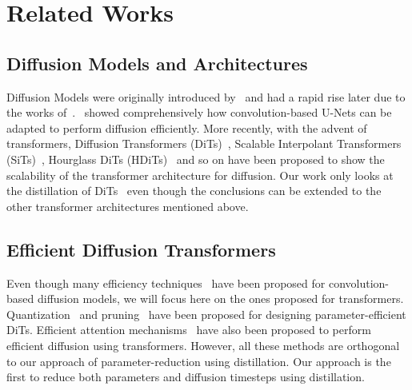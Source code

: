 \section{Related Works}
\vspace{-5pt}
\label{app: related works}
\subsection{Diffusion Models and Architectures}
Diffusion Models were originally introduced by~\citep{sohl2015deep} and had a rapid rise later due to the works of~\citep{song2019generative, ho2020denoising, song2020score}.~\citep{karras2022elucidating} showed comprehensively how convolution-based U-Nets can be adapted to perform diffusion efficiently. More recently, with the advent of transformers, Diffusion Transformers (DiTs)~\citep{peebles2023scalable}, Scalable Interpolant Transformers (SiTs)~\citep{ma2024sit}, Hourglass DiTs (HDiTs)~\citep{crowson2024scalable} and so on have been proposed to show the scalability of the transformer architecture for diffusion. Our work only looks at the distillation of DiTs~\citep{peebles2023scalable} even though the conclusions can be extended to the other transformer architectures mentioned above.

\subsection{Efficient Diffusion Transformers}
Even though many efficiency techniques~\citep{wang2024patch, li2023q, zhao2023mobilediffusion} have been proposed for convolution-based diffusion models, we will focus here on the ones proposed for transformers. Quantization~\citep{chen2024q, wu2024ptq4dit} and pruning~\citep{fang2024tinyfusion} have been proposed for designing parameter-efficient DiTs. Efficient attention mechanisms~\citep{pu2025efficient, yang2025inf} have also been proposed to perform efficient diffusion using transformers. However, all these methods are orthogonal to our approach of parameter-reduction using distillation. Our approach is the first to reduce both parameters and diffusion timesteps using distillation.

